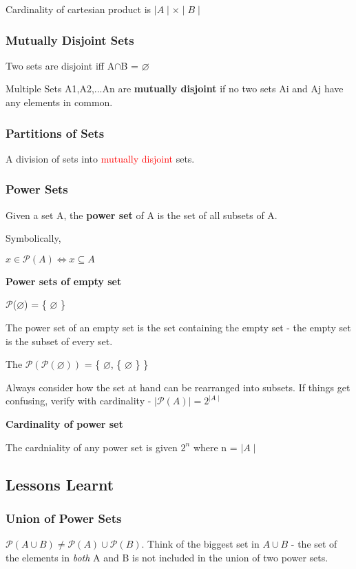 \documentclass{article}
\begin{document}
Cardinality of cartesian product is $\mid A\mid \times \mid B\mid$

\subsubsection{Mutually Disjoint Sets}
Two sets are disjoint iff A$\cap$B = $\varnothing$

Multiple Sets A1,A2,...An are \textbf{mutually disjoint} if no two sets Ai and Aj have any elements in common.

\subsubsection{Partitions of Sets}
A division of sets into \textcolor{red}{mutually disjoint} sets.

\subsubsection{Power Sets}
Given a set A, the \textbf{power set} of A is the set of all subsets of A.

Symbolically,
\begin{center}
    $ x \in \mathcal{P}(A) \iff x \subseteq A $
\end{center}

\vspace{10pt}

\textbf{Power sets of empty set}

$\mathcal{P}$($\varnothing$) = \{ $\varnothing$ \}

The power set of an empty set is the set containing the empty set - the empty set is the subset of every set.

The $\mathcal{P}(\mathcal{P}(\varnothing))$ = \{ $\varnothing$, \{ $\varnothing$ \} \}

Always consider how the set at hand can be rearranged into subsets. If things get confusing, verify with cardinality - $\mid \mathcal{P}(A) \mid = 2^{\mid A \mid}$

\vspace{10pt}

\textbf{Cardinality of power set}

The cardniality of any power set is given $2^n$ where n = $\mid A \mid$

\subsection{Lessons Learnt}
\subsubsection{Union of Power Sets}
$\mathcal{P}(A \cup B) \neq \mathcal{P}(A) \cup \mathcal{P}(B)$. Think of the biggest set in $A \cup B$ - the set of the elements in \textit{both} A and B is not included in the union of two power sets.
\end{document}
